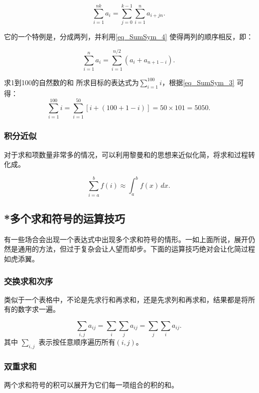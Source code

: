 \begin{equation}
\sum_{i=1}^{nk} a_i = \sum_{j=0}^{k-1} \sum_{i=1}^n a_{i+jn}.~
\end{equation}

它的一个特例是，分成两列，并利用\autoref{eq_SumSym_4} 使得两列的顺序相反，即：

\begin{equation}
\label{eq_SumSym_3}
\sum_{i=1}^n a_i = \sum_{i=1}^{n/2} (a_i + a_{n+1-i}).~
\end{equation}

\begin{example}
{求1到100的自然数的和}
所求目标的表达式为$\sum\limits_{i=1}^{100} i$，根据\autoref{eq_SumSym_3} 可得：
$$\sum\limits_{i=1}^{100} i= \sum_{i=1}^{50} [i + (100+1-i)]=50\times101=5050.~$$
\end{example}

\subsubsection{积分近似}
对于求和项数量非常多的情况，可以利用黎曼和的思想来近似化简，将求和过程转化成。

\begin{equation}
\sum_{i=a}^b f(i) \approx \int_a^b f(x) \, dx.~
\end{equation}


\subsection{*多个求和符号的运算技巧}

有一些场合会出现一个表达式中出现多个求和符号的情形。一如上面所说，展开仍然是通用的方法，但过于复杂会让人望而却步。下面的运算技巧绝对会让化简过程如虎添翼。

\subsubsection{交换求和次序}
类似于一个表格中，不论是先求行和再求和，还是先求列和再求和，结果都是将所有的数字求一遍。

\begin{equation}
\sum_{i,j} a_{ij}=\sum_{i} \sum_{j} a_{ij} = \sum_{j} \sum_{i} a_{ij}.~
\end{equation}
其中 $\sum\limits_{i,j}$ 表示按任意顺序遍历所有$(i,j)$。

\subsubsection{双重求和}
两个求和符号的积可以展开为它们每一项组合的积的和。

